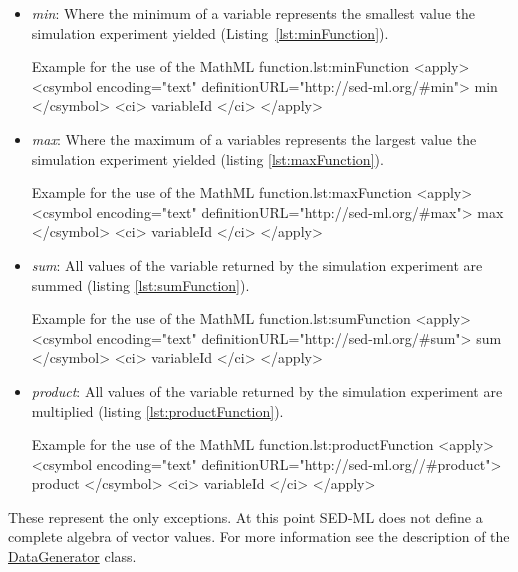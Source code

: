 \begin{itemize}\setlength{\parskip}{-0.1ex}

\item \emph{min}: Where the minimum of a variable represents the smallest value 
the simulation experiment yielded (Listing~\ref{lst:minFunction}). 
%
\begin{myXmlLst}{Example for the use of the MathML  function.}{lst:minFunction}
<apply>
 	<csymbol encoding="text" definitionURL="http://sed-ml.org/#min">
 		min
 	</csymbol>
 	<ci> variableId </ci>
</apply>
\end{myXmlLst}

\item \emph{max}: Where the maximum of a variables represents the largest value 
the simulation experiment yielded (listing \ref{lst:maxFunction}).
%
\begin{myXmlLst}{Example for the use of the MathML  function.}{lst:maxFunction}
<apply>
 	<csymbol encoding="text" definitionURL="http://sed-ml.org/#max">
 		max
 	</csymbol>
 	<ci> variableId </ci>
</apply>
\end{myXmlLst}

\item \emph{sum}: All values of the variable returned by the simulation 
experiment are summed (listing \ref{lst:sumFunction}).
%
\begin{myXmlLst}{Example for the use of the MathML  function.}{lst:sumFunction}
<apply>
 	<csymbol encoding="text" definitionURL="http://sed-ml.org/#sum">
 		sum
 	</csymbol>
 	<ci> variableId </ci>
</apply>
\end{myXmlLst}


\item \emph{product}: All values of the variable returned by the simulation 
experiment are multiplied (listing \ref{lst:productFunction}).
%
\begin{myXmlLst}{Example for the use of the MathML  function.}{lst:productFunction}
<apply>
 	<csymbol encoding="text" definitionURL="http://sed-ml.org//#product">
 		product
 	</csymbol>
 	<ci> variableId </ci>
</apply>
\end{myXmlLst}

\end{itemize}

These represent the only exceptions. At this point SED-ML \LoneVone does not define a complete algebra of vector values. For more information see the description of the \hyperref[class:dataGenerator]{DataGenerator} class.

